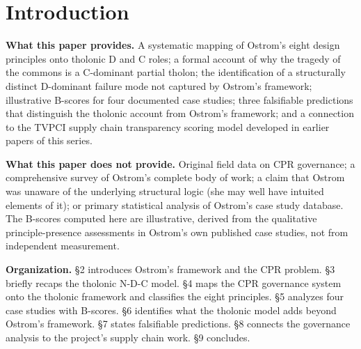 \documentclass[12pt]{article}
\begin{document}
\begin{abstract}
Illustrative B-scores are computed for four cases drawn from Ostrom's
documented case studies: Törbel, Switzerland (near-complete
institutional balance, \(B \approx 100\)); Alanya, Turkey
(above-threshold partial balance, \(B \approx 67\)); open-access fishery
collapse (C-dominant failure, \(B \to 0\)); and Atlantic groundfish
regulatory failure (D-dominant failure, \(B \to 0\) via the opposite
imbalance). Ostrom's framework predicts that all three non-ideal cases
are problematic; the tholonic model additionally predicts that the
C-dominant and D-dominant failures will produce structurally different
collapse patterns with different time profiles and different
intervention requirements. Three falsifiable predictions are stated.
\end{abstract}

\section{Introduction}\label{introduction}

\textbf{What this paper provides.} A systematic mapping of Ostrom's
eight design principles onto tholonic D and C roles; a formal account of
why the tragedy of the commons is a C-dominant partial tholon; the
identification of a structurally distinct D-dominant failure mode not
captured by Ostrom's framework; illustrative B-scores for four
documented case studies; three falsifiable predictions that distinguish
the tholonic account from Ostrom's framework; and a connection to the
TVPCI supply chain transparency scoring model developed in earlier
papers of this series.

\textbf{What this paper does not provide.} Original field data on CPR
governance; a comprehensive survey of Ostrom's complete body of work; a
claim that Ostrom was unaware of the underlying structural logic (she
may well have intuited elements of it); or primary statistical analysis
of Ostrom's case study database. The B-scores computed here are
illustrative, derived from the qualitative principle-presence
assessments in Ostrom's own published case studies, not from independent
measurement.

\textbf{Organization.} §2 introduces Ostrom's framework and the CPR
problem. §3 briefly recaps the tholonic N-D-C model. §4 maps the CPR
governance system onto the tholonic framework and classifies the eight
principles. §5 analyzes four case studies with B-scores. §6 identifies
what the tholonic model adds beyond Ostrom's framework. §7 states
falsifiable predictions. §8 connects the governance analysis to the
project's supply chain work. §9 concludes.
\end{document}
